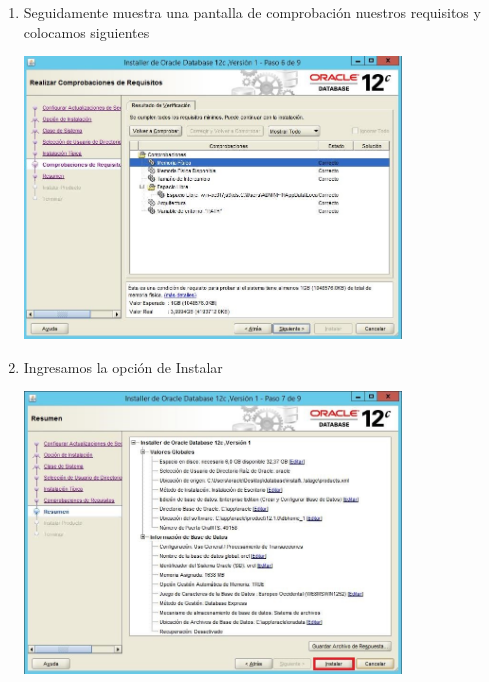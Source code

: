 \begin{enumerate}[1.]
	\hfill \break
	\hfill \break
	\hfill \break
	\hfill \break
	\hfill \break
	\hfill \break
	\hfill \break
	\hfill \break
	\item Seguidamente muestra una pantalla de comprobaci\'on nuestros requisitos y colocamos siguientes\\
	\begin{center}
	\includegraphics[width=10cm]{./Imagenes/img20} 
	\end{center}

	\item Ingresamos la opci\'on de Instalar\\
	\begin{center}
	\includegraphics[width=10cm]{./Imagenes/img21} 
	\end{center}


\end{enumerate}
